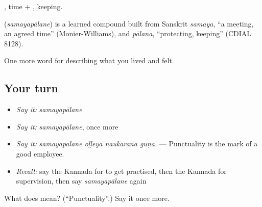 , time + , keeping.

\begin{cousinweb}
\textbf{} (\emph{samayapālane}) is a learned compound built from Sanskrit \emph{samaya}, \textquotedblleft{}a meeting, an agreed time\textquotedblright{} (Monier-Williams), and \emph{pālana}, \textquotedblleft{}protecting, keeping\textquotedblright{} (CDIAL 8128).
\end{cousinweb}

\begin{grammarlens}[title={What you've built}]
One more word for describing what you lived and felt.
\end{grammarlens}

\subsection*{Your turn}
\begin{itemize}
\raggedright
  \item \emph{Say it:} \emph{samayapālane}
  \item \emph{Say it:} \emph{samayapālane}, once more
  \item \emph{Say it:} \emph{samayapālane oḷḷeya naukarana guṇa.} — Punctuality is the mark of a good employee.
  \item \emph{Recall:} say the Kannada for to get practised, then the Kannada for supervision, then say \emph{samayapālane} again
\end{itemize}

\begin{tcolorbox}[breakable,colback=teal!4,colframe=teal!35!black,title={Before you move on}]
What does  mean? (\textquotedblleft{}Punctuality\textquotedblright{}.) Say it once more.
\end{tcolorbox}
